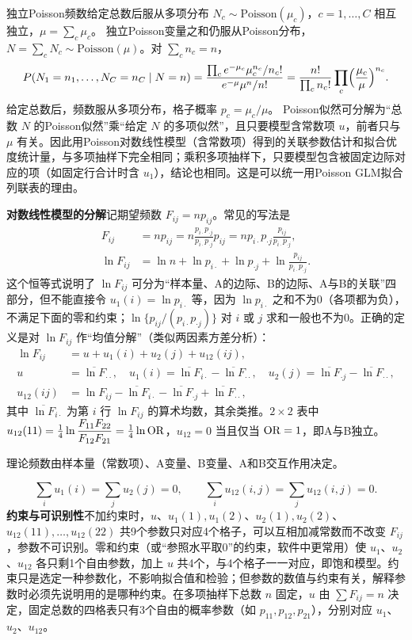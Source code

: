 \begin{derivation}{独立Poisson频数给定总数后服从多项分布}
$N_c\sim\text{Poisson}(\mu_c)$，$c=1,\ldots,C$ 相互独立，$\mu=\sum_c\mu_c$。
独立Poisson变量之和仍服从Poisson分布，$N=\sum_cN_c\sim\text{Poisson}(\mu)$。对 $\sum_cn_c=n$，
\[
P(N_1=n_1,\ldots,N_C=n_C\mid N=n)
=\frac{\prod_c e^{-\mu_c}\mu_c^{n_c}/n_c!}{e^{-\mu}\mu^n/n!}
=\frac{n!}{\prod_cn_c!}\prod_c\Bigl(\frac{\mu_c}{\mu}\Bigr)^{n_c}.
\]
给定总数后，频数服从多项分布，格子概率 $p_c=\mu_c/\mu$。
Poisson似然可分解为“总数 $N$ 的Poisson似然”乘“给定 $N$ 的多项似然”，且只要模型含常数项 $u$，前者只与 $\mu$ 有关。因此用Poisson对数线性模型（含常数项）得到的关联参数估计和拟合优度统计量，与多项抽样下完全相同；乘积多项抽样下，只要模型包含被固定边际对应的项（如固定行合计时含 $u_1$），结论也相同。这是可以统一用Poisson GLM拟合列联表的理由。
\end{derivation}
\textbf{对数线性模型的分解}\quad 记期望频数 $F_{ij}=np_{ij}$。常见的写法是
\begin{align*}
F_{ij}&=np_{ij}=n\frac{p_{i\cdot}p_{\cdot j}}{p_{i\cdot}p_{\cdot j}}p_{ij}
=np_{i\cdot}p_{\cdot j}\frac{p_{ij}}{p_{i\cdot}p_{\cdot j}},\\
\ln F_{ij}&=\ln n+\ln p_{i\cdot}+\ln p_{\cdot j}
+\ln\frac{p_{ij}}{p_{i\cdot}p_{\cdot j}}.
\end{align*}
这个恒等式说明了 $\ln F_{ij}$ 可分为“样本量、A的边际、B的边际、A与B的关联”四部分，但不能直接令 $u_1(i)=\ln p_{i\cdot}$ 等，因为 $\ln p_{i\cdot}$ 之和不为0（各项都为负），不满足下面的零和约束；$\ln\{p_{ij}/(p_{i\cdot}p_{\cdot j})\}$ 对 $i$ 或 $j$ 求和一般也不为0。正确的定义是对 $\ln F_{ij}$ 作“均值分解”（类似两因素方差分析）：
\begin{align*}
\ln F_{ij}&=u+u_1(i)+u_2(j)+u_{12}(ij),\\
u&=\overline{\ln F}_{\cdot\cdot},\quad
u_1(i)=\overline{\ln F}_{i\cdot}-\overline{\ln F}_{\cdot\cdot},\quad
u_2(j)=\overline{\ln F}_{\cdot j}-\overline{\ln F}_{\cdot\cdot},\\
u_{12}(ij)&=\ln F_{ij}-\overline{\ln F}_{i\cdot}-\overline{\ln F}_{\cdot j}+\overline{\ln F}_{\cdot\cdot},
\end{align*}
其中 $\overline{\ln F}_{i\cdot}$ 为第 $i$ 行 $\ln F_{ij}$ 的算术均数，其余类推。$2\times2$ 表中 $u_{12}(11)=\tfrac14\ln\dfrac{F_{11}F_{22}}{F_{12}F_{21}}=\tfrac14\ln\operatorname{OR}$，$u_{12}=0$ 当且仅当 $\operatorname{OR}=1$，即A与B独立。
\begin{annotation}理论频数由样本量（常数项）、A变量、B变量、A和B交互作用决定。\end{annotation}
\[
\sum_i u_1(i)=\sum_j u_2(j)=0,\qquad
\sum_i u_{12}(i,j)=\sum_j u_{12}(i,j)=0.
\]
\textbf{约束与可识别性}\quad 不加约束时，$u$、$u_1(1),u_1(2)$、$u_2(1),u_2(2)$、$u_{12}(11),\ldots,u_{12}(22)$ 共9个参数只对应4个格子，可以互相加减常数而不改变 $F_{ij}$，参数不可识别。零和约束（或“参照水平取0”的约束，软件中更常用）使 $u_1$、$u_2$、$u_{12}$ 各只剩1个自由参数，加上 $u$ 共4个，与4个格子一一对应，即饱和模型。约束只是选定一种参数化，不影响拟合值和检验；但参数的数值与约束有关，解释参数时必须先说明用的是哪种约束。在多项抽样下总数 $n$ 固定，$u$ 由 $\sum F_{ij}=n$ 决定，固定总数的四格表只有3个自由的概率参数（如 $p_{11},p_{12},p_{21}$），分别对应 $u_1$、$u_2$、$u_{12}$。
